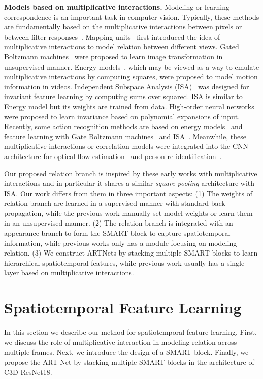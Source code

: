 \documentclass[10pt,twocolumn,letterpaper]{article}
\begin{document}
{\bf Models based on multiplicative interactions.} Modeling or learning correspondence is an important task in computer vision. Typically, these methods are fundamentally based on the multiplicative interactions between pixels or between filter responses~\cite{Memisevic13}. Mapping units~\cite{Hinton81a} first introduced the idea of multiplicative interactions to model relation between different views. Gated Boltzmann machines~\cite{MemisevicH07} were proposed to learn image transformation in unsupervised manner. Energy models~\cite{Energymodel}, which may be viewed as a way to emulate multiplicative interactions by computing squares, were proposed to model motion information in videos. Independent Subspace Analysis (ISA)~\cite{HyvarinenH00} was designed for invariant feature learning by computing sums over squared. ISA is similar to Energy model but its weights are trained from data. High-order neural networks~\cite{giles1987learning} were proposed to learn invariance based on polynomial expansions of input. Recently, some action recognition methods are based on energy models~\cite{DerpanisSCW10,WangQT13} and feature learning with Gate Boltzmann machines~\cite{TaylorFLB10} and ISA~\cite{LeZYN11}. Meanwhile, these multiplicative interactions or correlation models were integrated into the CNN architecture for optical flow estimation~\cite{DosovitskiyFIHH15} and person re-identification~\cite{LiZXW14}. 

Our proposed relation branch is inspired by these early works with multiplicative interactions and in particular it shares a similar {\em square-pooling} architecture with ISA. Our work differs from them in three important aspects: (1) The weights of relation branch are learned in a supervised manner with standard back propagation, while the previous work manually set model weights or learn them in an unsupervised manner. (2) The relation branch is integrated with an appearance branch to form the SMART block to capture spatiotemporal information, while previous works only has a module focusing on modeling relation. (3) We construct ARTNets by stacking multiple SMART blocks to learn hierarchical spatiotemporal features, while previous work usually has a single layer based on multiplicative interactions.

\section{Spatiotemporal Feature Learning}

In this section we describe our method for spatiotemporal feature learning. First, we discuss the role of multiplicative interaction in modeling relation across multiple frames. Next, we introduce the design of a SMART block. Finally, we propose the ART-Net by stacking multiple SMART blocks in the architecture of C3D-ResNet18.
\end{document}
